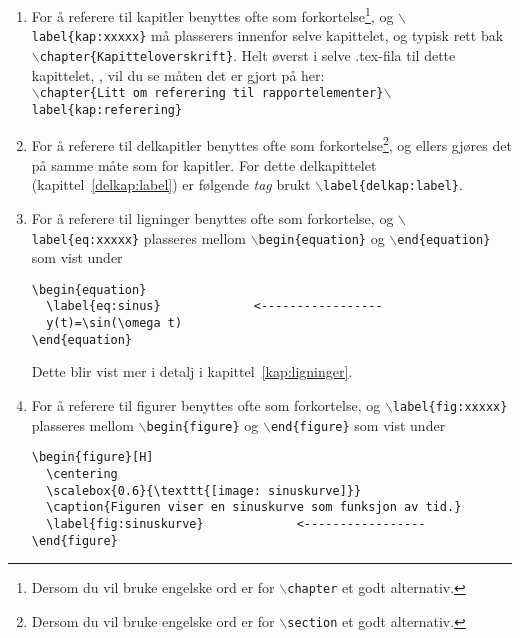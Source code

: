 \begin{enumerate}
\item For å referere til {\color{red}kapitler} benyttes ofte  som
  forkortelse\footnote{Dersom du vil bruke engelske ord er   for {\tt $\backslash$chapter} et godt alternativ.}, og  
  {\tt $\backslash$label\{kap:xxxxx\}} må plasserers innenfor selve
  kapittelet, og typisk rett bak 
  {\tt $\backslash$chapter\{Kapitteloverskrift\}}. Helt øverst i selve .tex-fila til dette
  kapittelet, , vil du se måten det
  er gjort på her:\\
 {\tt $\backslash$chapter\{Litt om referering til 
    rapportelementer\}$\backslash$label\{kap:referering\} } 

\item For å referere til {\color{red}delkapitler} benyttes ofte  som
  forkortelse\footnote{Dersom du vil bruke engelske ord er  for {\tt $\backslash$section} et godt alternativ.}, og ellers gjøres det på samme måte som for
  kapitler. For dette delkapittelet (kapittel~\ref{delkap:label}) er
  følgende {\em tag} brukt   {\tt $\backslash$label\{delkap:label\}}.

\item For å referere til {\color{red}ligninger} benyttes ofte  som
  forkortelse, og {\tt $\backslash$label\{eq:xxxxx\}}  plasseres
  mellom {\tt $\backslash$begin\{equation\}} og 
  {\tt $\backslash$end\{equation\}} som vist   under

  \begin{boxedminipage}{\textwidth}
\begin{verbatim}
\begin{equation}
  \label{eq:sinus}             <-----------------
  y(t)=\sin(\omega t)
\end{equation}
\end{verbatim}
  \end{boxedminipage}

  Dette blir vist mer i detalj i kapittel~\ref{kap:ligninger}. \label{pkt:ligning}

\item For å referere til {\color{red}figurer} benyttes ofte  som
  forkortelse, og  {\tt $\backslash$label\{fig:xxxxx\}} plasseres
  mellom {\tt $\backslash$begin\{figure\}} og 
  {\tt $\backslash$end\{figure\}} som vist under

  \begin{boxedminipage}{\textwidth}
\begin{verbatim}
\begin{figure}[H]
  \centering
  \scalebox{0.6}{\texttt{[image: sinuskurve]}}
  \caption{Figuren viser en sinuskurve som funksjon av tid.} 
  \label{fig:sinuskurve}             <-----------------
\end{figure}
\end{verbatim}
  \end{boxedminipage}


\end{enumerate}
